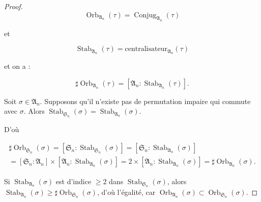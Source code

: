\documentclass[french]{book}
\theoremstyle{definition}
\begin{document}
\begin{proof}
  \[\operatorname{Orb}_{\mathfrak{A}_n}(\tau) = \operatorname{Conjug}_{\mathfrak{A}_n}(\tau)\]

  et

  \[\operatorname{Stab}_{\mathfrak{A}_n}(\tau) = \text{centralisateur}_{\mathfrak{A}_n}(\tau)\]

  et on a :

  \[\sharp\operatorname{Orb}_{\mathfrak{A}_n}(\tau) = [\mathfrak{A}_n : \operatorname{Stab}_{\mathfrak{A}_n}(\tau)].\]

  Soit \(\sigma \in \mathfrak{A}_n\). Supposons qu'il n'existe pas de permutation impaire qui commute avec \(\sigma\). Alors \(\operatorname{Stab}_{\mathfrak{S}_n}(\sigma) = \operatorname{Stab}_{\mathfrak{A}_n}(\sigma)\).

  D'où

  \begin{gather*}
    \sharp\operatorname{Orb}_{\mathfrak{S}_n}(\sigma) = [\mathfrak{S}_n : \operatorname{Stab}_{\mathfrak{S}_n}(\sigma)] = [\mathfrak{S}_{n} : \operatorname{Stab}_{\mathfrak{A}_n}(\sigma)] \\
    = [\mathfrak{S}_n : \mathfrak{A}_n] \times [\mathfrak{A}_n : \operatorname{Stab}_{\mathfrak{A}_n}(\sigma)] = 2 \times [\mathfrak{A}_n : \operatorname{Stab}_{\mathfrak{A}_n}(\sigma)] = \sharp\operatorname{Orb}_{\mathfrak{A}_n}(\sigma).
  \end{gather*}

  Si \(\operatorname{Stab}_{\mathfrak{A}_n}(\sigma)\) est d'indice \(\geq  2\) dans \(\operatorname{Stab}_{\mathfrak{S}_n}(\sigma)\), alors \(\operatorname{Stab}_{\mathfrak{A}_n}(\sigma) \geq  \sharp \operatorname{Orb}_{\mathfrak{S}_n}(\sigma)\), d'où l'égalité, car \(\operatorname{Orb}_{\mathfrak{A}_n}(\sigma) \subset \operatorname{Orb}_{\mathfrak{S}_n}(\sigma)\).
\end{proof}
\end{document}
